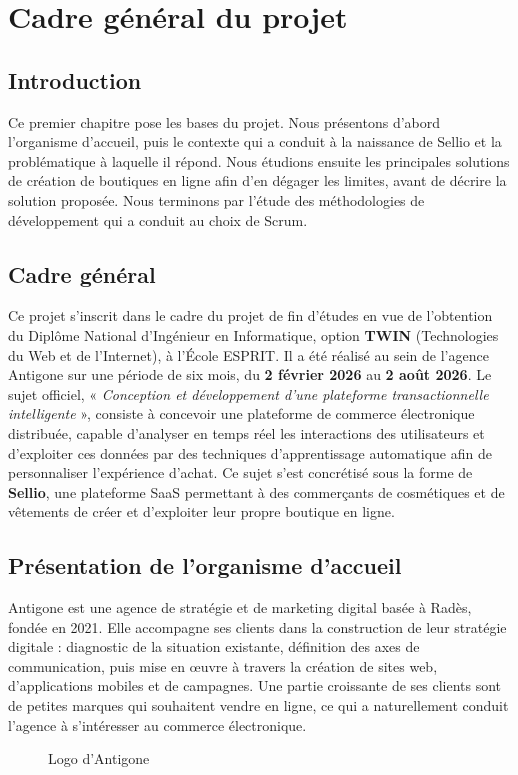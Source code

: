 \thispagestyle{fancy}
\chapter{Cadre général du projet}
\section*{Introduction}
Ce premier chapitre pose les bases du projet. Nous présentons d'abord l'organisme d'accueil, puis le contexte qui a conduit à la naissance de Sellio et la problématique à laquelle il répond. Nous étudions ensuite les principales solutions de création de boutiques en ligne afin d'en dégager les limites, avant de décrire la solution proposée. Nous terminons par l'étude des méthodologies de développement qui a conduit au choix de Scrum.

\section{Cadre général}
Ce projet s'inscrit dans le cadre du projet de fin d'études en vue de l'obtention du Diplôme National d'Ingénieur en Informatique, option \textbf{TWIN} (Technologies du Web et de l'Internet), à l'École ESPRIT. Il a été réalisé au sein de l'agence Antigone sur une période de six mois, du \textbf{2 février 2026} au \textbf{2 août 2026}. Le sujet officiel, « \textit{Conception et développement d'une plateforme transactionnelle intelligente} », consiste à concevoir une plateforme de commerce électronique distribuée, capable d'analyser en temps réel les interactions des utilisateurs et d'exploiter ces données par des techniques d'apprentissage automatique afin de personnaliser l'expérience d'achat. Ce sujet s'est concrétisé sous la forme de \textbf{Sellio}, une plateforme SaaS permettant à des commerçants de cosmétiques et de vêtements de créer et d'exploiter leur propre boutique en ligne.

\section{Présentation de l'organisme d'accueil}
\begin{samepage}
\noindent
\begin{minipage}{\textwidth}
Antigone est une agence de stratégie et de marketing digital basée à Radès, fondée en 2021. Elle accompagne ses clients dans la construction de leur stratégie digitale : diagnostic de la situation existante, définition des axes de communication, puis mise en œuvre à travers la création de sites web, d'applications mobiles et de campagnes. Une partie croissante de ses clients sont de petites marques qui souhaitent vendre en ligne, ce qui a naturellement conduit l'agence à s'intéresser au commerce électronique.
\begin{figure}[H]
    \centering
    \caption{Logo d'Antigone}
    \label{fig:Antigone_logo}
\end{figure}
\end{minipage}
\end{samepage}

